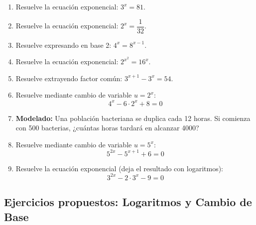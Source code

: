 \documentclass[12pt, letterpaper]{article}
\begin{document}
\begin{enumerate}[resume=ejercicios, leftmargin=*]
  \item \facil{} Resuelve la ecuación exponencial: $3^x = 81$.

  \item \facil{} Resuelve la ecuación exponencial: $2^x = \dfrac{1}{32}$.

  \item \medio{} Resuelve expresando en base 2: $4^x = 8^{x - 1}$.

  \item \medio{} Resuelve la ecuación exponencial: $2^{x^2} = 16^x$.

  \item \medio{} Resuelve extrayendo factor común: $3^{x + 1} - 3^x = 54$.

  \item \dificil{} Resuelve mediante cambio de variable $u = 2^x$:
        $$4^x - 6 \cdot 2^x + 8 = 0$$

  \item \dificil{} \textbf{Modelado:} Una población bacteriana se duplica cada 12 horas. Si comienza con 500 bacterias, ¿cuántas horas tardará en alcanzar 4000?

  \item \dificil{} Resuelve mediante cambio de variable $u = 5^x$:
        $$5^{2x} - 5^{x + 1} + 6 = 0$$

  \item \muyDificil{} Resuelve la ecuación exponencial (deja el resultado con logaritmos):
        $$3^{2x} - 2 \cdot 3^x - 9 = 0$$
\end{enumerate}

\subsection{Ejercicios propuestos: Logaritmos y Cambio de Base}
\end{document}
